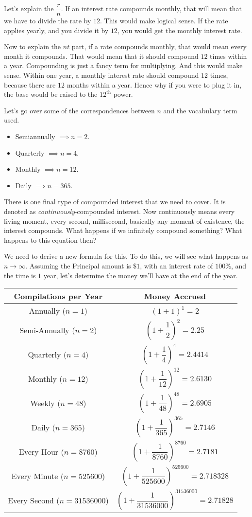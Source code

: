 \documentclass[../book.tex]{subfiles}
\begin{document}
Let's explain the $\dfrac{r}{n}$.  If an interest rate compounds monthly, that will mean that we have to divide the rate by $12$.  This would make logical sense.  If the rate applies yearly, and you divide it by $12$, you would get the monthly interest rate.  

Now to explain the $nt$ part, if a rate compounds monthly, that would mean every month it compounds.  That would mean that it should compound $12$ times within a year.  Compounding is just a fancy term for multiplying.  And this would make sense.  Within one year, a monthly interest rate should compound $12$ times, because there are $12$ months within a year.  Hence why if you were to plug it in, the base would be raised to the $12^{\text{th}}$ power.  

Let's go over some of the correspondences between $n$ and the vocabulary term used.  \begin{itemize}
    \item Semiannually $\implies n=2$.
    \item Quarterly $\implies n=4$.
    \item Monthly $\implies n=12$.
    \item Daily $\implies n=365$.
\end{itemize}

There is one final type of compounded interest that we need to cover.  It is denoted as \textit{continuously}-compounded interest.  Now continuously means every living moment, every second, millisecond, basically any moment of existence, the interest compounds.  What happens if we infinitely compound something?  What happens to this equation then?

We need to derive a new formula for this.  To do this, we will see what happens as $n\to\infty$.  Assuming the Principal amount is $\$1$, with an interest rate of $100\%$, and the time is $1$ year, let's determine the money we'll have at the end of the year.

\begin{tabular}{||c|c||}
    \hline
    Compilations per Year & Money Accrued \\
    \hline
    Annually ($n=1$) & $(1+1)^1=2$ \\
    \hline
    Semi-Annually ($n=2$) & $\left(1+\dfrac{1}{2}\right)^{2}=2.25$ \\
    \hline
    Quarterly ($n=4$) & $\left(1+\dfrac{1}{4}\right)^{4}=2.4414$ \\
    \hline
    Monthly ($n=12$) & $\left(1+\dfrac{1}{12}\right)^{12}=2.6130$ \\
    \hline
    Weekly ($n=48$) & $\left(1+\dfrac{1}{48}\right)^{48}=2.6905$ \\
    \hline
    Daily ($n=365$) & $\left(1+\dfrac{1}{365}\right)^{365}=2.7146$ \\
    \hline
    Every Hour ($n=8760$) & $\left(1+\dfrac{1}{8760}\right)^{8760}=2.7181$ \\
    \hline
    Every Minute ($n=525600$) & $\left(1+\dfrac{1}{525600}\right)^{525600}=2.718328$ \\
    \hline
    Every Second ($n=31536000$) & $\left(1+\dfrac{1}{31536000}\right)^{31536000}=2.71828$ \\
    \hline
\end{tabular}
\end{document}

